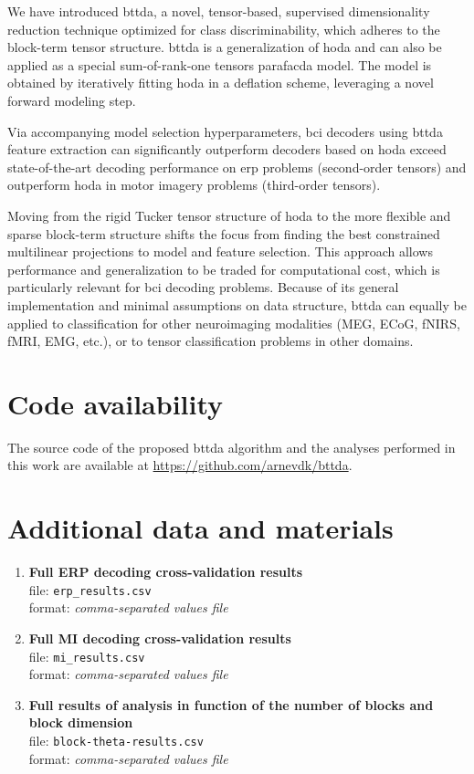 \documentclass[twocolumn]{article}
\begin{document}
We have introduced \acf{bttda}, a novel,
tensor-based, supervised dimensionality reduction technique optimized for class
discriminability, which adheres to the block-term tensor structure.
\Ac{bttda} is a generalization of \acf{hoda} and can also be
applied as a special sum-of-rank-one tensors \ac{parafacda} model.
The model is obtained by iteratively fitting \ac{hoda} in a deflation scheme,
leveraging a novel forward modeling step.

Via accompanying model selection hyperparameters, \ac{bci} decoders using
\ac{bttda} feature extraction can significantly outperform decoders based on
\ac{hoda} exceed state-of-the-art decoding performance on \acl{erp} problems
(second-order tensors) and outperform \ac{hoda} in motor imagery problems
(third-order tensors).

Moving from the rigid Tucker tensor structure of \ac{hoda} to the more flexible
and sparse block-term structure shifts the focus from finding the best constrained
multilinear projections to model and feature selection.
This approach allows performance and generalization to be traded for computational cost,
which is particularly relevant for \ac{bci} decoding problems.
Because of its general implementation and minimal assumptions on data structure,
\ac{bttda} can equally be applied to classification for other neuroimaging modalities
(MEG, ECoG, fNIRS, fMRI, EMG, etc.), or to tensor classification problems in other
domains.

\section*{Code availability}

The source code of the proposed \ac{bttda} algorithm and the analyses performed in
this work are available at \url{https://github.com/arnevdk/bttda}.

\section*{Additional data and materials}
\begin{enumerate}
	\item\textbf{Full ERP decoding cross-validation results} \\
	file: \texttt{erp\_results.csv}\\
	format: \textit{comma-separated values file}
	\label{item:add/erp-results}
	\item\textbf{Full MI decoding cross-validation results} \\
	file: \texttt{mi\_results.csv}\\
	format: \textit{comma-separated values file}
	\label{item:add/mi-results}
	\item\textbf{Full results of analysis in function of the number of blocks and block dimension}\\
	file: \texttt{block-theta-results.csv}\\
	format: \textit{comma-separated values file}
	\label{item:add/blocks}
\end{enumerate}
\end{document}
